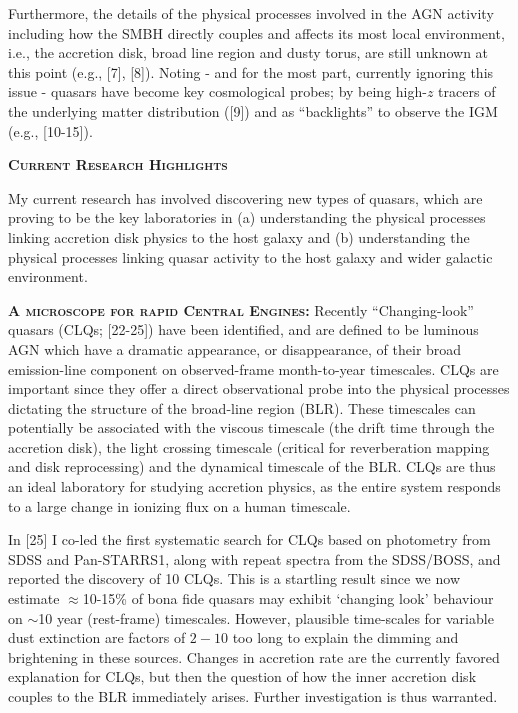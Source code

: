 \documentclass[oneside, a4paper, onecolumn, 11pt]{article}
\begin{document}
\smallskip 
\smallskip
\noindent
Furthermore, the details of the physical processes involved in the AGN
activity including how the SMBH directly couples and affects its most
local environment, i.e., the accretion disk, broad line region and
dusty torus, are still unknown at this point (e.g., [7], [8]). Noting
- and for the most part, currently ignoring this issue - quasars have
become key cosmological probes; by being high-$z$ tracers of the
underlying matter distribution ([9]) and as ``backlights'' to observe
the IGM (e.g., [10-15]).



\medskip 
\medskip
\noindent
{\bfseries \large \textsc{\textcolor{Cerulean}{Current Research Highlights}}}

\smallskip
\smallskip
\noindent
My current research has involved discovering new types of quasars,
which are proving to be the key laboratories in (a) understanding the
physical processes linking accretion disk physics to the host galaxy
and (b) understanding the physical processes linking quasar activity
to the host galaxy and wider galactic environment.






\smallskip \smallskip
\smallskip
\smallskip
\noindent
\textbf{\textsc{A microscope for rapid Central Engines:}}
Recently ``Changing-look'' quasars (CLQs; [22-25]) have been
identified, and are defined to be luminous AGN which have a dramatic
appearance, or disappearance, of their broad emission-line component
on observed-frame month-to-year timescales.  CLQs are important since
they offer a direct observational probe into the physical processes
dictating the structure of the broad-line region (BLR). These
timescales can potentially be associated with the viscous timescale
(the drift time through the accretion disk), the light crossing
timescale (critical for reverberation mapping and disk reprocessing)
and the dynamical timescale of the BLR.  CLQs are thus an ideal
laboratory for studying accretion physics, as the entire system
responds to a large change in ionizing flux on a human timescale.

\smallskip \smallskip
\noindent 
In [25] I co-led the first systematic search for CLQs based on
photometry from SDSS and Pan-STARRS1, along with repeat spectra from
the SDSS/BOSS, and reported the discovery of 10 CLQs. This is a
startling result since we now estimate $\approx$10-15\% of bona fide
quasars may exhibit `changing look' behaviour on $\sim$10 year 
(rest-frame) timescales. However, plausible time-scales for variable
dust extinction are factors of $2-10$ too long to explain the dimming
and brightening in these sources.  Changes in accretion rate are the
currently favored explanation for CLQs, but then the question of how
the inner accretion disk couples to the BLR immediately
arises. Further investigation is thus warranted.
\end{document}
